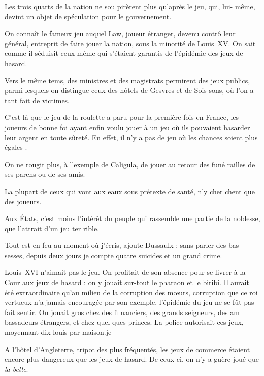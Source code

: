 Les trois quarts de la nation ne sou%
pirèrent plus qu'après le jeu, qui, lui-%
même, devint un objet de spéculation
pour le gouvernement.

On connaît le fameux jeu auquel
Law, joueur étranger, devenu contrô%
leur général, entreprit de faire jouer la
nation, sous la minorité de Louis~XV.
On sait comme il séduisit ceux même
qui s'étaient garantis de l'épidémie
des jeux de hasard.

Vers le même tems, des ministres
et des magistrats permirent des jeux
publics, parmi lesquels on distingue
ceux des hôtels de Gesvres et de Sois%
sons, où l'on a tant fait de victimes.

C'est là que le jeu de la roulette a
paru pour la première fois en France,
les joueurs de bonne foi ayant enfin
voulu jouer à un jeu où ils pouvaient
hasarder leur argent en toute sûreté.
En effet, il n'y a pas de jeu où les
chances soient plus égales .


On ne rougit plus, à l'exemple de
Caligula, de jouer au retour des funé%
railles de ses parens ou de ses amis.

La plupart de ceux qui vont aux
eaux sous prétexte de santé, n'y cher%
chent que des joueurs.

Aux États, c'est moins l'intérêt du
peuple qui rassemble une partie de la
noblesse, que l'attrait d'un jeu ter%
rible.

Tout est en feu au moment où j'écris,
ajoute Dussaulx ; sans parler des bas%
sesses, depuis deux jours je compte
quatre suicides et un grand crime.

Louis~XVI n'aimait pas le jeu. On
profitait de son absence pour se livrer
à la Cour aux jeux de hasard : on y
jouait sur-tout le pharaon et le biribi.
Il aurait été extraordinaire qu'au
milieu de la corruption des mœurs,
corruption que ce roi vertueux n'a
jamais encouragée par son exemple,
l'épidémie du jeu ne se fût pas fait
sentir. On jouait gros chez des fi%
nanciers, des grands seigneurs, des am%
bassadeurs étrangers, et chez quel%
ques princes. La police autorisait ces
jeux, moyennant dix louis par maison.je

A l'hôtel d'Angleterre, tripot des
plus fréquentés, les jeux de commerce
étaient encore plus dangereux que les
jeux de hasard. De ceux-ci, on n'y a
guère joué que \emph{la belle}.


